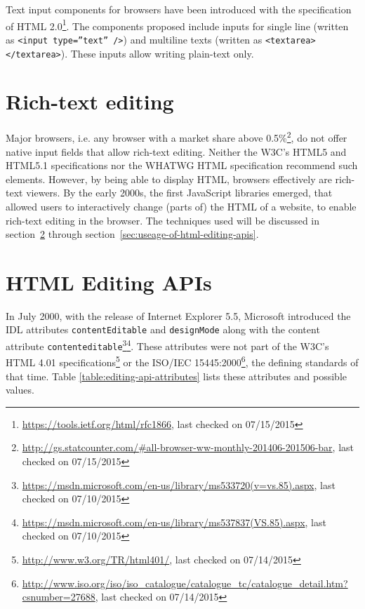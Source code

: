 Text input components for browsers have been introduced with the specification of HTML 2.0\footnote{\url{https://tools.ietf.org/html/rfc1866}, last checked on 07/15/2015}. The components proposed include inputs for single line (written as \texttt{<input type=''text'' />}) and multiline texts (written as \texttt{<textarea></textarea>}). These inputs allow writing plain-text only.


\section{Rich-text editing}

Major browsers, i.e. any browser with a market share above 0.5\%\footnote{\url{http://gs.statcounter.com/#all-browser-ww-monthly-201406-201506-bar}, last checked on 07/15/2015}, do not offer native input fields that allow rich-text editing. Neither the W3C's HTML5 and HTML5.1 specifications nor the WHATWG HTML specification recommend such elements. However, by being able to display HTML, browsers effectively are rich-text viewers. By the early 2000s, the first JavaScript libraries emerged, that allowed users to interactively change (parts of) the HTML of a website, to enable rich-text editing in the browser. The techniques used will be discussed in section~\ref{sec:html-editing-apis} through section~\ref{sec:useage-of-html-editing-apis}.

\section{HTML Editing APIs}
\label{sec:html-editing-apis}

In July 2000, with the release of Internet Explorer 5.5, Microsoft introduced the IDL attributes \texttt{contentEditable} and \texttt{designMode} along with the content attribute \texttt{contenteditable}\footnote{\url{https://msdn.microsoft.com/en-us/library/ms533720(v=vs.85).aspx}, last checked on 07/10/2015}\footnote{\url{https://msdn.microsoft.com/en-us/library/ms537837(VS.85).aspx}, last checked on 07/10/2015}. These attributes were not part of the W3C's HTML 4.01 specifications\footnote{\url{http://www.w3.org/TR/html401/}, last checked on 07/14/2015} or the ISO/IEC 15445:2000\footnote{\url{http://www.iso.org/iso/iso\_catalogue/catalogue\_tc/catalogue\_detail.htm?csnumber=27688}, last checked on 07/14/2015}, the defining standards of that time. Table \ref{table:editing-api-attributes} lists these attributes and possible values.

